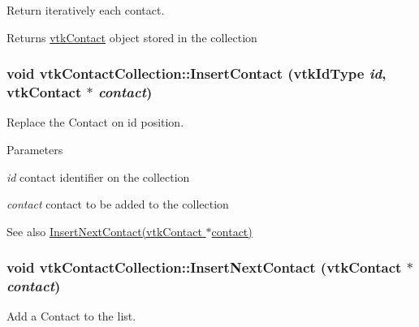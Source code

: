 Return iteratively each contact. 

\begin{DoxyReturn}{Returns}
\hyperlink{classvtkContact}{vtkContact} object stored in the collection 
\end{DoxyReturn}
\hypertarget{classvtkContactCollection_a0e50a84b758bf14a4936fffb51a39287}{
\subsubsection[{InsertContact}]{\setlength{\rightskip}{0pt plus 5cm}void vtkContactCollection::InsertContact (vtkIdType {\em id}, \/  {\bf vtkContact} $\ast$ {\em contact})}}
\label{classvtkContactCollection_a0e50a84b758bf14a4936fffb51a39287}


Replace the Contact on id position. 


\begin{DoxyParams}{Parameters}
\item[{\em id}]contact identifier on the collection \item[{\em contact}]contact to be added to the collection \end{DoxyParams}
\begin{DoxySeeAlso}{See also}
\hyperlink{classvtkContactCollection_a5ef415a23ede7e5f198a94380c9eec44}{InsertNextContact(vtkContact $\ast$contact)} 
\end{DoxySeeAlso}
\hypertarget{classvtkContactCollection_a5ef415a23ede7e5f198a94380c9eec44}{
\subsubsection[{InsertNextContact}]{\setlength{\rightskip}{0pt plus 5cm}void vtkContactCollection::InsertNextContact ({\bf vtkContact} $\ast$ {\em contact})}}
\label{classvtkContactCollection_a5ef415a23ede7e5f198a94380c9eec44}


Add a Contact to the list. 


